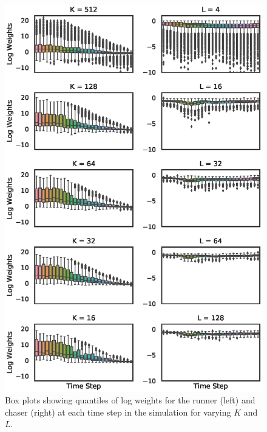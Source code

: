\documentclass[twoside]{article}
\begin{document}
\begin{figure}[!t]
\begin{center}
\centerline{\hspace{-0.2em}\includegraphics[width=1.05\columnwidth]{EXP-A2-particle_var.eps}}
\caption{Box plots showing quantiles of log weights for the runner (left) and chaser (right) at each time step in the simulation for varying $K$ and $L$.}
\label{fig:box_plots}
\end{center}
\vskip -0.4in
\end{figure} 

\end{document}
